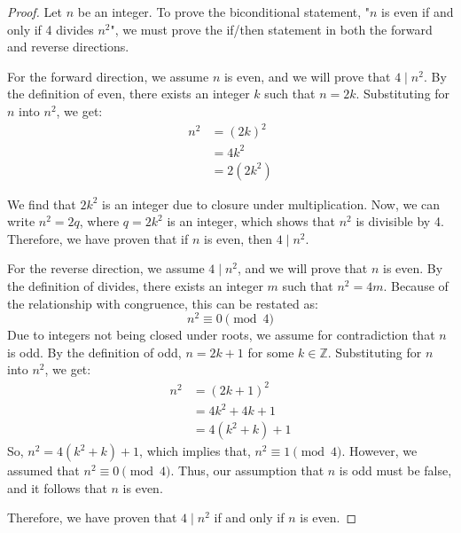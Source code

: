 \begin{proof}
    Let \( n \) be an integer. To prove the biconditional statement, "\( n \) is even if and only if 4 divides \( n^2 \)", we must prove the if/then statement in both the forward and reverse directions.

    \vspace{1em}

    For the forward direction, we assume \( n \) is even, and we will prove that \( 4 \mid n^2 \). By the definition of even, there exists an integer \( k \) such that \( n = 2k \). Substituting for \( n \) into \( n^2 \), we get:
    \begin{align*}
        n^2 &= (2k)^2 \\
             &= 4k^2 \\
             &= 2(2k^2)
    \end{align*}
    
    We find that \( 2k^2 \) is an integer due to closure under multiplication. Now, we can write \( n^2 = 2q \), where \( q = 2k^2 \) is an integer, which shows that \( n^2 \) is divisible by 4. Therefore, we have proven that if \( n \) is even, then \( 4 \mid n^2 \).

    \vspace{1em}

    For the reverse direction, we assume \( 4 \mid n^2 \), and we will prove that \( n \) is even. By the definition of divides, there exists an integer \( m \) such that \( n^2 = 4m \). Because of the relationship with congruence, this can be restated as:
    \[ n^2 \equiv 0 \pmod{4} \]
    Due to integers not being closed under roots, we assume for contradiction that \( n \) is odd. By the definition of odd, \( n = 2k + 1 \) for some \( k \in \mathbb{Z} \). Substituting for \( n \) into \( n^2 \), we get:
    \begin{align*}
        n^2 &= (2k + 1)^2 \\
             &= 4k^2 + 4k + 1 \\
             &= 4(k^2 + k) + 1
    \end{align*}
    So, \( n^2 = 4(k^2 + k) + 1 \), which implies that, \( n^2 \equiv 1 \pmod{4} \). However, we assumed that \( n^2 \equiv 0 \pmod{4} \). Thus, our assumption that \( n \) is odd must be false, and it follows that \( n \) is even.

    \vspace{1em}
    
    Therefore, we have proven that \( 4 \mid n^2 \) if and only if \( n \) is even.
\end{proof}
 

